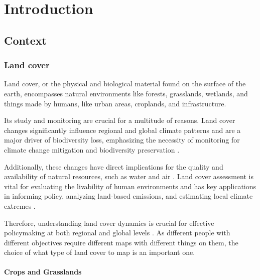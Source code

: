 \chapter[Introduction]{Introduction}
\label{cha:Chapter1}
\vspace*{\fill}


\newpage

\section{Context}


\subsection*{Land cover}

    Land cover, or the physical and biological material found on the surface of the earth, encompasses natural environments like forests, grasslands, wetlands, and things made by humans, like urban areas, croplands, and infrastructure. 
    
    Its study and monitoring are crucial for a multitude of reasons. Land cover changes significantly influence regional and global climate patterns and are a major driver of biodiversity loss, emphasizing the necessity of monitoring for climate change mitigation and biodiversity preservation \citep{pielke2002influence, houghton2012carbon, sala2000global, cbd2016indicators}. 
    
    Additionally, these changes have direct implications for the quality and availability of natural resources, such as water and air \citep{foley2005global}. Land cover assessment is vital for evaluating the livability of human environments \citep{levering2024landscape} and has key applications in informing policy, analyzing land-based emissions, and estimating local climate extremes \citep{duveiller2020, hong2021luemissions, sy2020}. 
    
    Therefore, understanding land cover dynamics is crucial for effective policymaking at both regional and global levels \citep{liu2020assessing, trisurat2019land, shumba2020effectiveness}. As different people with different objectives require different maps with different things on them, the choice of what type of land cover to map is an important one. 

    \subsubsection*{Crops and Grasslands}

